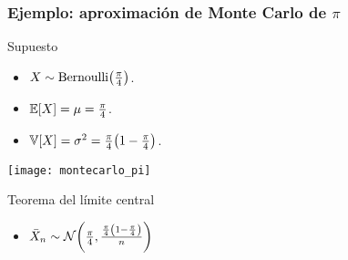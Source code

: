 \documentclass[table]{beamer}
\begin{document}
\begin{frame}
    \frametitle{Ejemplo: aproximación de Monte Carlo de $\pi$}
    \begin{block}{Supuesto}
        \begin{itemize}
            \item $X \sim \bernoulli{\frac{\pi}{4}}$.
            \item $\expected{X} = \mu = \frac{\pi}{4}$.
            \item $\variance{X} = \sigma^{2} = \frac{\pi}{4} \parens{1 - \frac{\pi}{4}}$.
        \end{itemize}
    \end{block}
    \begin{center}
        \texttt{[image: montecarlo\_pi]}
    \end{center}
    \begin{block}{Teorema del límite central}
        \begin{itemize}
            \item $\bar{X}_{n} \sim \normal{\frac{\pi}{4}}{\frac{\frac{\pi}{4} \parens{1 - \frac{\pi}{4}}}{n}}$
        \end{itemize}
    \end{block}
\end{frame}
\end{document}
